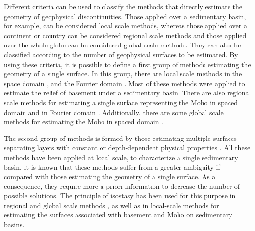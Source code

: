 \documentclass[manuscript]{geophysics}
\begin{document}
Different criteria can be used to classify the methods that directly estimate
the geometry of geophysical discontinuities.
Those applied over a sedimentary basin, for example, can be considered local scale methods,
whereas those applied over a continent or country can be considered regional scale methods
and those applied over the whole globe can be considered global scale methods.
They can also be classified according to the number of geophysical surfaces
to be estimated.
By using these criteria, it is possible to define a first group of methods
estimating the geometry of a single surface.
In this group, there are local scale methods in the space domain
\citep[e.g.,][]{bott1960, tanner1967, cordell-henderson1968, dyrelius-vogel1972, pedersen1977,
pilkington-crossley1986, richardson-macinnes1989, barbosa-etal1997, condi-etal1999, 
barbosa-etal1999, barbosa-etal1999b, silva-etal2006, pilkington2006, 
chakravarthi-sundararajan2007, martins-etal2010, silva-etal2010, lima-etal2011, 
martins-etal2011, barnes-barraud2012, silva-etal2014, silva-santos2017},
and the Fourier domain
\citep[e.g.,][]{oldenburg1974, granser1987, reamer-ferguson1989, guspi1993}.
Most of these methods were applied to estimate the relief of basement under
a sedimentary basin.
There are also regional scale methods for estimating a single surface 
representing the Moho in spaced domain 
\citep[e.g.,][]{shin-etal2009, bagherbandi-eshagh2012, barzaghi-biagi2014, 
sampietro2015, uieda-barbosa2017} and in Fourier domain 
\citep[e.g.,][]{braitenberg-etal1997, braitenberg-zadro1999, vandermeijde-etal2013}.
Additionally, there are some global scale methods for estimating the Moho
in spaced domain
\citep[e.g.,][]{sunkel1985, sjoberg2009}.

The second group of methods is formed by those estimating multiple surfaces
separating layers with constant or depth-dependent physical properties 
\citep[e.g.,][]{pilkington-crossley1986b, condi-etal1999, gallardo-etal2005, 
camacho-etal2011, salem-etal2014, ferderer-etal2017, garcia-abdeslem2017, salem2017}.
All these methods have been applied at local scale, to characterize a single 
sedimentary basin.
It is known that these methods suffer from a greater ambiguity if compared with 
those estimating the geometry of a single surface.
As a consequence, they require more a priori information to
decrease the number of possible solutions.
The principle of isostasy has been used for this purpose in 
regional and global scale methods 
\citep[e.g.,][]{sunkel1985, shin-etal2009, sjoberg2009, bagherbandi-eshagh2012, sampietro2015},
as well as in local-scale methods for estimating the surfaces 
associated with basement and Moho on sedimentary basins.
\end{document}
